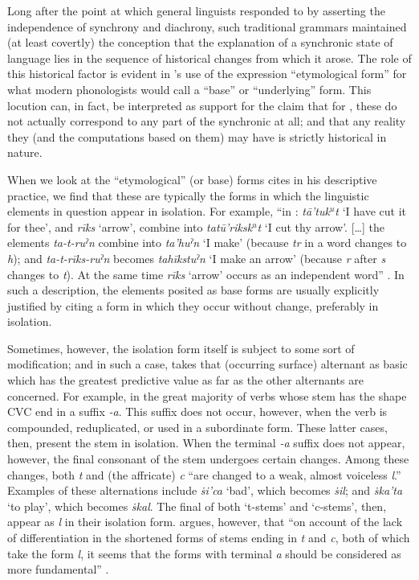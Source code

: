 Long after the point at which general linguists responded to {\Saussure}
by asserting the independence of synchrony and diachrony, such
traditional grammars maintained (at least covertly) the conception
that the {explanation} of a synchronic state of language lies in the
sequence of historical changes from which it arose. The role of this
historical factor is evident in {\Boas}'s use of the expression
``etymological form'' for what modern phonologists would call a ``base''
or ``underlying'' form. This locution can, in fact, be interpreted as
support for the claim that for {\Boas}, these  do not
actually correspond to any part of the synchronic  at
all; and that any reality they (and the computations based on them)
may have is strictly historical in nature.

When we look at the ``etymological'' (or base) forms {\Boas} cites in his
descriptive practice, we find that these are typically the forms in
which the linguistic elements in question appear in isolation. For
example, ``in : \emph{tā'tuk$^{u}$t} `I have cut it for thee',
and \emph{rīks} `arrow', combine into \emph{tatū'riksk$^{u}$t} `I cut
thy arrow'. [\ldots] the elements \emph{ta-t-ruˀn} combine into
\emph{ta'huˀn} `I make' (because \emph{tr} in a word changes to
\emph{h}); and \emph{ta-t-rīks-ruˀn} becomes \emph{tahīkstuˀn} `I make
an arrow' (because \emph{r} after \emph{s} changes to \emph{t}). At
the same time \emph{rīks} `arrow' occurs as an independent word''
\citep[31f.]{boas11:introduction}. In such a description, the elements
posited as base forms are usually explicitly justified by citing a
form in which they occur without change, preferably in isolation.

Sometimes, however, the isolation form itself is subject to some sort
of modification; and in such a case, {\Boas} takes that (occurring
surface) alternant as basic which has the greatest predictive value as
far as the other alternants are concerned. For example, in  the
great majority of verbs whose stem has the shape CVC end in a suffix
\emph{-a}. This suffix does not occur, however, when the verb is
compounded, reduplicated, or used in a subordinate form. These latter
cases, then, present the stem in isolation. When the terminal
\emph{-a} suffix does not appear, however, the final consonant of the
stem undergoes certain changes. Among these changes, both \emph{t} and
(the affricate) \emph{c} ``are changed to a weak, almost voiceless
\emph{l}.'' Examples of these alternations include \emph{ṡi'ca} `bad',
which becomes \emph{ṡil}; and \emph{ṡka'ta} `to play', which becomes
\emph{ṡkal}. The final  of both `t-stems' and `c-stems',
then, appear as \emph{l} in their isolation form. {\Boas} argues,
however, that ``on account of the lack of differentiation in the
shortened forms of stems ending in \emph{t} and \emph{c}, both of
which take the form \emph{l}, it seems that the forms with terminal
\emph{a} should be considered as more fundamental''
\citep[12]{boas.deloria39:dakota}.

